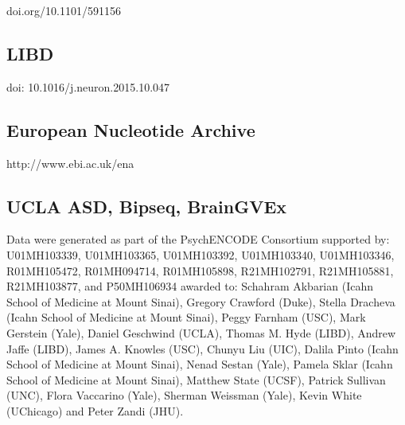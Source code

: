 doi.org/10.1101/591156 

\subsection{LIBD}

doi: 10.1016/j.neuron.2015.10.047 


\subsection{European Nucleotide Archive }

http://www.ebi.ac.uk/ena 

\subsection{UCLA ASD, Bipseq, BrainGVEx}

Data were generated as part of the PsychENCODE Consortium supported by: U01MH103339, U01MH103365, U01MH103392, U01MH103340, U01MH103346, R01MH105472, R01MH094714, R01MH105898, R21MH102791, R21MH105881, R21MH103877, and P50MH106934 awarded to: Schahram Akbarian (Icahn School of Medicine at Mount Sinai), Gregory Crawford (Duke), Stella Dracheva (Icahn School of Medicine at Mount Sinai), Peggy Farnham (USC), Mark Gerstein (Yale), Daniel Geschwind (UCLA), Thomas M. Hyde (LIBD), Andrew Jaffe (LIBD), James A. Knowles (USC), Chunyu Liu (UIC), Dalila Pinto (Icahn School of Medicine at Mount Sinai), Nenad Sestan (Yale), Pamela Sklar (Icahn School of Medicine at Mount Sinai), Matthew State (UCSF), Patrick Sullivan (UNC), Flora Vaccarino (Yale), Sherman Weissman (Yale), Kevin White (UChicago) and Peter Zandi (JHU). 





